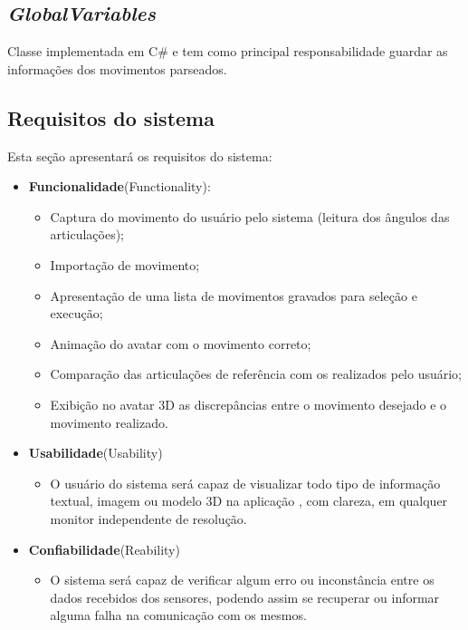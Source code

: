   \subsection{\textit{GlobalVariables}}\label{sub:gvariable}
    Classe implementada em C\# e tem como principal responsabilidade guardar as informações dos movimentos parseados.


  \subsection{Requisitos do sistema}\label{sec:requisitosSistema}
   Esta seção apresentará os requisitos do sistema:
   \begin{itemize}
   \item \textbf{Funcionalidade}(Functionality):
     \begin{itemize}
     \item Captura do movimento do usuário pelo sistema (leitura dos ângulos das articulações);
     \item Importação de movimento;
     \item Apresentação de uma lista de movimentos gravados para seleção e execução;
     \item Animação do avatar com o movimento correto;
     \item Comparação das articulações de referência com os realizados pelo usuário;
     \item Exibição no avatar 3D as discrepâncias entre o movimento desejado e o movimento realizado.
     \end{itemize}
   \item \textbf{Usabilidade}(Usability)
     \begin{itemize}
     \item O usuário do sistema será capaz de visualizar todo tipo de informação
      textual, imagem ou modelo 3D na aplicação , com clareza, em qualquer
     monitor independente de resolução.
     \end{itemize}
  \item \textbf{Confiabilidade}(Reability)
     \begin{itemize}
     \item O sistema será capaz de verificar algum erro ou inconstância entre os
      dados recebidos dos sensores, podendo assim se recuperar ou informar
     alguma falha na comunicação com os mesmos.

\end{itemize}
\end{itemize}
